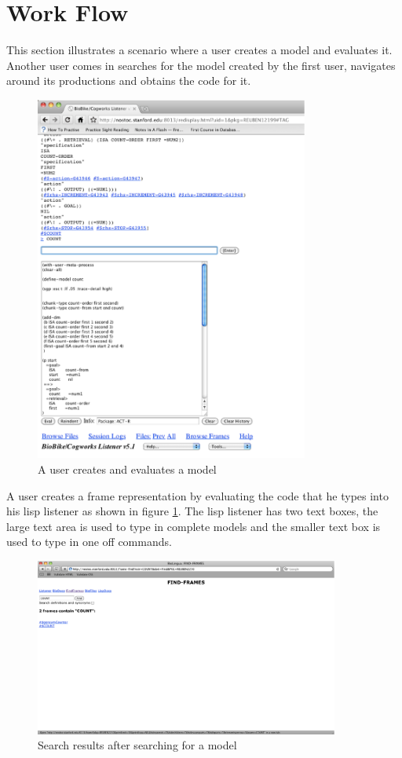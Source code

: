 \section{Work Flow}

This section illustrates a scenario where a user creates a model and
evaluates it. Another user comes in searches for the model created by
the first user, navigates around its productions and obtains the code for
it. 

\begin{figure}[htp]
  \centering
  \includegraphics[width=90mm]{UserCreatesModel}
  \caption{A user creates and evaluates a model}
  \label{UserCreatesModel}
\end{figure}

A user creates a frame representation by evaluating the code that he
types into his lisp listener as shown in figure
\ref{UserCreatesModel}. The lisp listener has two text boxes, the
large text area is used to type in complete models and the smaller
text box is used to type in one off commands.

\begin{figure}[htp]
  \centering
  \includegraphics[width=100mm]{SearchForModel}
  \caption{Search results after searching for a model}
  \label{SearchForModel}
\end{figure}

